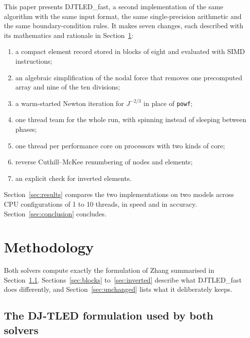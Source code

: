 \documentclass[11pt,a4paper]{article}
\newcommand{\DJF}{DJTLED\_fast}
\newcommand{\code}[1]{\texttt{#1}}
\newcommand{\Jm}{J^{-2/3}}
\begin{document}
This paper presents \DJF, a second implementation of the same algorithm with the same input format, the same single-precision arithmetic and the same boundary-condition rules. It makes seven changes, each described with its mathematics and rationale in Section~\ref{sec:method}:
\begin{enumerate}
\item a compact element record stored in blocks of eight and evaluated with SIMD instructions;
\item an algebraic simplification of the nodal force that removes one precomputed array and nine of the ten divisions;
\item a warm-started Newton iteration for $\Jm$ in place of \code{powf};
\item one thread team for the whole run, with spinning instead of sleeping between phases;
\item one thread per performance core on processors with two kinds of core;
\item reverse Cuthill--McKee renumbering of nodes and elements;
\item an explicit check for inverted elements.
\end{enumerate}
Section~\ref{sec:results} compares the two implementations on two models across CPU configurations of 1 to 10 threads, in speed and in accuracy. Section~\ref{sec:conclusion} concludes.

\section{Methodology}
\label{sec:method}

Both solvers compute exactly the formulation of Zhang \cite{zhang2021} summarised in Section~\ref{sec:formulation}. Sections~\ref{sec:blocks} to~\ref{sec:inverted} describe what \DJF{} does differently, and Section~\ref{sec:unchanged} lists what it deliberately keeps.

\subsection{The DJ-TLED formulation used by both solvers}
\label{sec:formulation}
\end{document}
